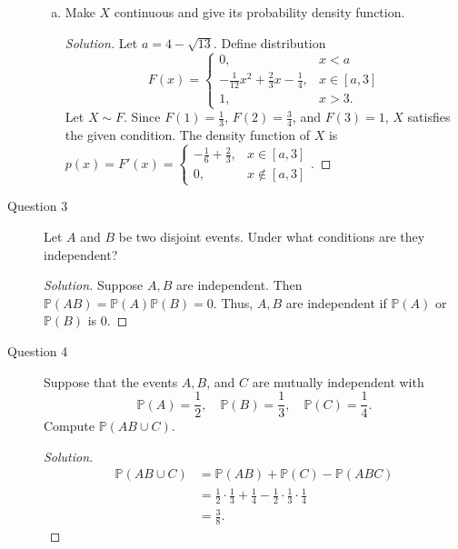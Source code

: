 \documentclass[addpoints, 11pt]{exam}
\newcommand*{\prob}{\mathds{P}}
\begin{document}
\begin{description}
\begin{enumerate}[(a)]
        \item Make $X$ continuous and give its probability density function.

        \begin{proof}[Solution]
            Let $a = 4-\sqrt{13}$. Define distribution
            \[
                F(x) = \begin{cases}
            0, & x < a \\
            -\frac{1}{12}x^2 + \frac{2}{3}x - \frac{1}{4}, & x \in [a, 3] \\
            1, & x > 3.
        \end{cases}
            \]
            Let $X \sim F$. Since $F(1) = \frac{1}{3}$, $F(2) = \frac{3}{4}$, and $F(3) = 1$, $X$ satisfies the given condition. The density function of $X$ is $p(x) = F'(x) = \begin{cases}
                -\frac{1}{6} + \frac{2}{3}, & x \in [a, 3] \\
                0, & x \notin [a, 3]
            \end{cases}$. 
        \end{proof}
    \end{enumerate}

    \newpage

    \item[Question 3] Let $A$ and $B$ be two disjoint events. Under what conditions are they independent?

    \begin{proof}[Solution]
        Suppose $A,B$ are independent. Then $\prob(AB) = \prob(A)\prob(B) = 0$. Thus, $A,B$ are independent if $\prob(A)$ or $\prob(B)$ is 0.
    \end{proof}

    \newpage

    \item[Question 4] Suppose that the events $A, B$, and $C$ are mutually independent with
    \[
        \prob(A) = \frac{1}{2}, \quad \prob(B) = \frac{1}{3}, \quad \prob(C) = \frac{1}{4}.
    \]
    Compute $\prob(AB \cup C)$.

    \begin{proof}[Solution]
        \begin{align}
            \prob(AB \cup C)
            &= \prob(AB) + \prob(C) - \prob(ABC) \\
            &= \frac{1}{2} \cdot \frac{1}{3} + \frac{1}{4} - \frac{1}{2} \cdot \frac{1}{3} \cdot \frac{1}{4} \\
            &= \frac{3}{8}.
        \end{align}
    \end{proof}


\end{description}
\end{document}
